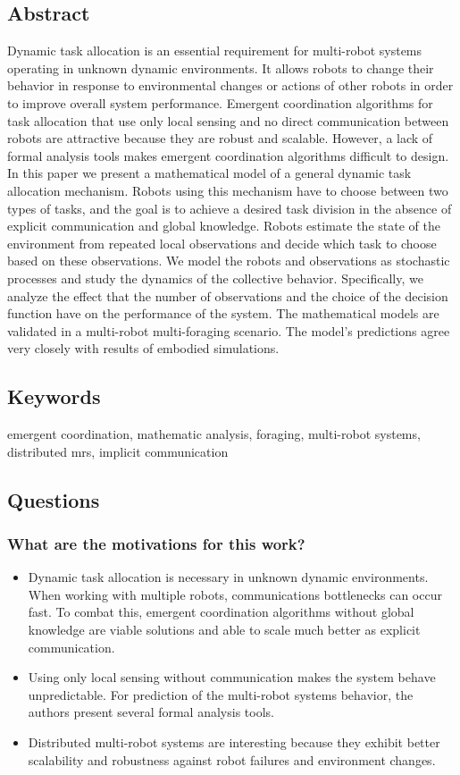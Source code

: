 \documentclass{article}
\begin{document}
\subsection*{Abstract}
Dynamic task allocation is an essential requirement for multi-robot
systems operating in unknown dynamic environments. It allows
robots to change their behavior in response to environmental changes
or actions of other robots in order to improve overall system performance. Emergent coordination algorithms for task allocation that
use only local sensing and no direct communication between robots
are attractive because they are robust and scalable. However, a lack
of formal analysis tools makes emergent coordination algorithms
difficult to design. In this paper we present a mathematical model
of a general dynamic task allocation mechanism. Robots using this
mechanism have to choose between two types of tasks, and the goal
is to achieve a desired task division in the absence of explicit communication and global knowledge. Robots estimate the state of the
environment from repeated local observations and decide which task
to choose based on these observations. We model the robots and observations as stochastic processes and study the dynamics of the collective behavior. Specifically, we analyze the effect that the number
of observations and the choice of the decision function have on the
performance of the system. The mathematical models are validated
in a multi-robot multi-foraging scenario. The model’s predictions
agree very closely with results of embodied simulations.

\subsection*{Keywords}
emergent coordination, mathematic analysis, foraging, multi-robot systems, distributed mrs, implicit communication

\subsection*{Questions}
\subsubsection*{What are the motivations for this work?}
\begin{itemize}
    \item Dynamic task allocation is necessary in unknown dynamic environments. When working with multiple robots, communications bottlenecks can occur fast. To combat this, emergent coordination algorithms without global knowledge are viable solutions and able to scale much better as explicit communication.
    \item Using only local sensing without communication makes the system behave unpredictable. For prediction of the multi-robot systems behavior, the authors present several formal analysis tools. 
    \item Distributed multi-robot systems are interesting because they exhibit better scalability and robustness against robot failures and environment changes. 
\end{itemize}
\end{document}
